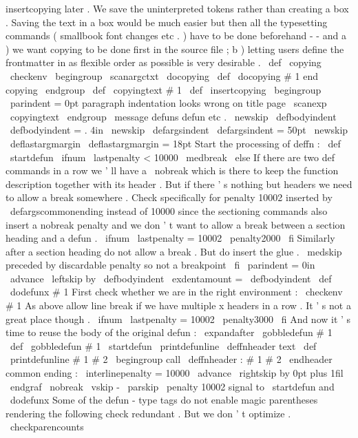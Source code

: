 {insertcopying
later
.
%
%
We
save
the
uninterpreted
tokens
rather
than
creating
a
box
.
%
Saving
the
text
in
a
box
would
be
much
easier
but
then
all
the
%
typesetting
commands
(
smallbook
font
changes
etc
.
)
have
to
be
done
%
beforehand
-
-
and
a
)
we
want
copying
to
be
done
first
in
the
source
%
file
;
b
)
letting
users
define
the
frontmatter
in
as
flexible
order
as
%
possible
is
very
desirable
.
%
\
def
\
copying
{
\
checkenv
{
}
\
begingroup
\
scanargctxt
\
docopying
}
\
def
\
docopying
#
1
end
copying
{
\
endgroup
\
def
\
copyingtext
{
#
1
}
}
%
\
def
\
insertcopying
{
%
\
begingroup
\
parindent
=
0pt
%
paragraph
indentation
looks
wrong
on
title
page
\
scanexp
\
copyingtext
\
endgroup
}
\
message
{
defuns
}
%
defun
etc
.
\
newskip
\
defbodyindent
\
defbodyindent
=
.
4in
\
newskip
\
defargsindent
\
defargsindent
=
50pt
\
newskip
\
deflastargmargin
\
deflastargmargin
=
18pt
%
Start
the
processing
of
deffn
:
\
def
\
startdefun
{
%
\
ifnum
\
lastpenalty
<
10000
\
medbreak
\
else
%
If
there
are
two
def
commands
in
a
row
we
'
ll
have
a
\
nobreak
%
which
is
there
to
keep
the
function
description
together
with
its
%
header
.
But
if
there
'
s
nothing
but
headers
we
need
to
allow
a
%
break
somewhere
.
Check
specifically
for
penalty
10002
inserted
%
by
\
defargscommonending
instead
of
10000
since
the
sectioning
%
commands
also
insert
a
nobreak
penalty
and
we
don
'
t
want
to
allow
%
a
break
between
a
section
heading
and
a
defun
.
%
\
ifnum
\
lastpenalty
=
10002
\
penalty2000
\
fi
%
%
Similarly
after
a
section
heading
do
not
allow
a
break
.
%
But
do
insert
the
glue
.
\
medskip
%
preceded
by
discardable
penalty
so
not
a
breakpoint
\
fi
%
\
parindent
=
0in
\
advance
\
leftskip
by
\
defbodyindent
\
exdentamount
=
\
defbodyindent
}
\
def
\
dodefunx
#
1
{
%
%
First
check
whether
we
are
in
the
right
environment
:
\
checkenv
#
1
%
%
%
As
above
allow
line
break
if
we
have
multiple
x
headers
in
a
row
.
%
It
'
s
not
a
great
place
though
.
\
ifnum
\
lastpenalty
=
10002
\
penalty3000
\
fi
%
%
And
now
it
'
s
time
to
reuse
the
body
of
the
original
defun
:
\
expandafter
\
gobbledefun
#
1
%
}
\
def
\
gobbledefun
#
1
\
startdefun
{
}
%
\
printdefunline
\
deffnheader
{
text
}
%
\
def
\
printdefunline
#
1
#
2
{
%
\
begingroup
%
call
\
deffnheader
:
#
1
#
2
\
endheader
%
common
ending
:
\
interlinepenalty
=
10000
\
advance
\
rightskip
by
0pt
plus
1fil
\
endgraf
\
nobreak
\
vskip
-
\
parskip
\
penalty
10002
%
signal
to
\
startdefun
and
\
dodefunx
%
Some
of
the
defun
-
type
tags
do
not
enable
magic
parentheses
%
rendering
the
following
check
redundant
.
But
we
don
'
t
optimize
.
\
checkparencounts
}}
